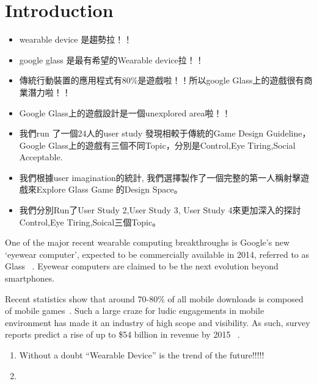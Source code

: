 \section{Introduction}

\begin{itemize}
\item wearable device 是趨勢拉！！
\item google glass 是最有希望的Wearable device拉！！
\item 傳統行動裝置的應用程式有80\%是遊戲啦！！所以google Glass上的遊戲很有商業潛力啦！！
\item Google Glass上的遊戲設計是一個unexplored area啦！！
\item 我們run 了一個24人的user study 發現相較于傳統的Game Design Guideline，Google Glass上的遊戲有三個不同Topic，分別是Control,Eye Tiring,Social Acceptable.
\item 我們根據user imagination的統計, 我們選擇製作了一個完整的第一人稱射擊遊戲來Explore Glass Game 的Design Space。
\item 我們分別Run了User Study 2,User Study 3, User Study 4來更加深入的探討Control,Eye Tiring,Soical三個Topic。
\end{itemize}

One of the major recent wearable computing breakthroughs is Google’s new ‘eyewear computer’, expected to be commercially available in 2014, referred to as Glass ~\cite{googleglass}. Eyewear computers are claimed to be the next evolution beyond smartphones.
 
Recent statistics show that around 70-80\% of all mobile downloads is composed of mobile games~\cite{statistics,infographic}. Such a large craze for ludic engagements in mobile environment has made it an industry of high scope and visibility. As such, survey reports predict a rise of up to \$54 billion in revenue by 2015 ~\cite{statistics,infographic}.

\begin{enumerate}
\item Without a doubt ``Wearable Device'' is the trend of the future!!!!!
\item
\end{enumerate}

